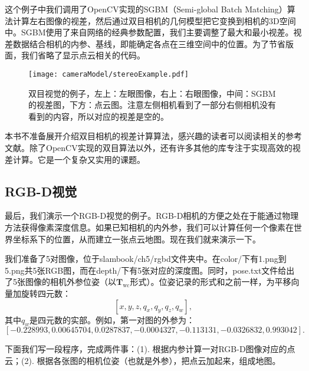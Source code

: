 这个例子中我们调用了OpenCV实现的SGBM（Semi-global Batch Matching）\textsuperscript{\cite{Hirschmuller2008}}算法计算左右图像的视差，然后通过双目相机的几何模型把它变换到相机的3D空间中。SGBM使用了来自网络的经典参数配置，我们主要调整了最大和最小视差。视差数据结合相机的内参、基线，即能确定各点在三维空间中的位置。为了节省版面，我们省略了显示点云相关的代码。

\begin{figure}[!t]
    \centering
    \texttt{[image: cameraModel/stereoExample.pdf]}
    \caption{双目视觉的例子，左上：左眼图像，右上：右眼图像，中间：SGBM的视差图，下方：点云图。注意左侧相机看到了一部分右侧相机没有看到的内容，所以对应的视差是空的。}
    \label{fig:stereoExample}
\end{figure}

本书不准备展开介绍双目相机的视差计算算法，感兴趣的读者可以阅读相关的参考文献\textsuperscript{\cite{Scharstein2002, Seitz2006}}。除了OpenCV实现的双目算法以外，还有许多其他的库专注于实现高效的视差计算。它是一个复杂又实用的课题。

\subsection{RGB-D视觉}
\label{sec:join-point-cloud}
最后，我们演示一个RGB-D视觉的例子。RGB-D相机的方便之处在于能通过物理方法获得像素深度信息。如果已知相机的内外参，我们可以计算任何一个像素在世界坐标系下的位置，从而建立一张点云地图。现在我们就来演示一下。

我们准备了5对图像，位于slambook/ch5/rgbd文件夹中。在color/下有1.png到5.png共5张RGB图，而在depth/下有5张对应的深度图。同时，pose.txt文件给出了5张图像的相机外参位姿（以$\bm{T}_\mathrm{wc}$形式）。位姿记录的形式和之前一样，为平移向量加旋转四元数：
\[
[x,y,z,q_x,q_y,q_z, q_w],
\]
其中$q_w$是四元数的实部。例如，第一对图的外参为：
\[
[-0.228993, 0.00645704, 0.0287837, -0.0004327, -0.113131, -0.0326832, 0.993042].
\]

下面我们写一段程序，完成两件事：(1). 根据内参计算一对RGB-D图像对应的点云；(2). 根据各张图的相机位姿（也就是外参），把点云加起来，组成地图。

